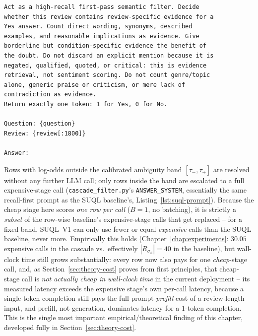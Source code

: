 \begin{lstlisting}[style=prompt, caption={Cheap Stage~1 scoring prompt, verbatim from \texttt{project SUQL/v1/scorer.py}.}, label={lst:suql-v1-cheap}]
Act as a high-recall first-pass semantic filter. Decide
whether this review contains review-specific evidence for a
Yes answer. Count direct wording, synonyms, described
examples, and reasonable implications as evidence. Give
borderline but condition-specific evidence the benefit of
the doubt. Do not discard an explicit mention because it is
negated, qualified, quoted, or critical: this is evidence
retrieval, not sentiment scoring. Do not count genre/topic
alone, generic praise or criticism, or mere lack of
contradiction as evidence.
Return exactly one token: 1 for Yes, 0 for No.

Question: {question}
Review: {review[:1800]}

Answer:
\end{lstlisting}

Rows with log-odds outside the calibrated ambiguity band
$[\tau_-,\tau_+]$ are resolved without any further LLM call; only rows
inside the band are escalated to a full expensive-stage call
(\texttt{cascade\_filter.py}'s \texttt{ANSWER\_SYSTEM}, essentially the
same recall-first prompt as the SUQL baseline's, Listing~\ref{lst:suql-prompt}).
Because the cheap stage here scores \emph{one row per call} ($B=1$, no
batching), it is strictly a \emph{subset} of the row-wise baseline's
expensive-stage calls that get replaced -- for a fixed band, SUQL~V1 can
only use fewer or equal \emph{expensive} calls than the SUQL baseline,
never more. Empirically this holds (Chapter~\ref{chap:experiments}: 
$30.05$ expensive calls in the cascade vs.\ effectively $|R_{\sigma_S}|=40$
in the baseline), but wall-clock time still grows substantially: every
row now also pays for one \emph{cheap}-stage call, and, as
Section~\ref{sec:theory-cost} proves from first principles, that
cheap-stage call is \emph{not actually cheap in wall-clock time} in the
current deployment -- its measured latency exceeds the expensive
stage's own per-call latency, because a single-token completion still
pays the full prompt-\emph{prefill} cost of a review-length input, and
prefill, not generation, dominates latency for a 1-token completion.
This is the single most important empirical/theoretical finding of this
chapter, developed fully in Section~\ref{sec:theory-cost}.

